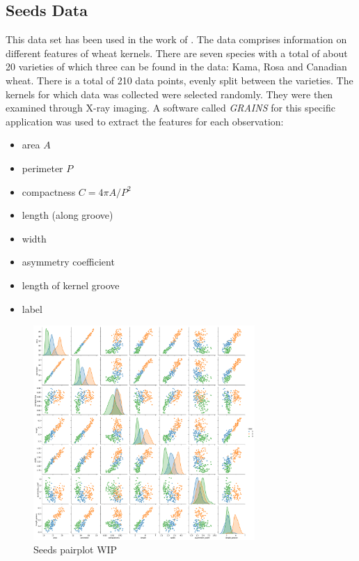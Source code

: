\subsection{Seeds Data}

This data set has been used in the work of \cite{charytanowicz2010complete}. The data comprises information on different features of wheat kernels. There are seven species with a total of about 20 varieties of which three can be found in the data: Kama, Rosa and Canadian wheat. There is a total of 210 data points, evenly split between the varieties. The kernels for which data was collected were selected randomly. They were then examined through X-ray imaging. A software called \textit{GRAINS} for this specific application \cite{strumillo1999computer} was used to extract the features for each observation:
\begin{multicols}{2}
\begin{itemize}
\item area $A$
\item perimeter $P$
\item compactness $C = 4 \pi A/P^{2}$
\item length (along groove)
\item width
\item asymmetry coefficient
\item length of kernel groove
\item label
\end{itemize}
\end{multicols}

\begin{figure}[h]
\caption{Seeds pairplot WIP}
%
\begin{center}
\includegraphics[width=0.75\textwidth]{images/seeds_pairplot.pdf}
\end{center}
\label{img:seeds_pairplot}
\end{figure}

